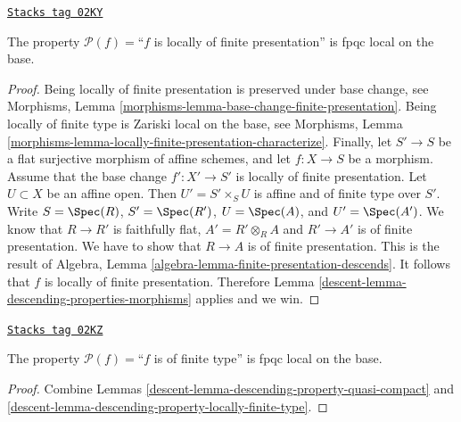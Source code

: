 \begin{lemma}
\label{descent-lemma-descending-property-locally-finite-presentation}
\href{https://stacks.math.columbia.edu/tag/02KY}{\texttt{Stacks tag 02KY}}

The property $\mathcal{P}(f) =$``$f$ is locally of finite presentation''
is fpqc local on the base.
\end{lemma}

\begin{proof}

Being locally of finite presentation is preserved under base change, see
Morphisms, Lemma \ref{morphisms-lemma-base-change-finite-presentation}.
Being locally of finite type is Zariski local on the base, see Morphisms,
Lemma \ref{morphisms-lemma-locally-finite-presentation-characterize}.
Finally, let
$S' \to S$ be a flat surjective morphism of affine schemes,
and let $f : X \to S$ be a morphism. Assume that the base change
$f' : X' \to S'$ is locally of finite presentation.
Let $U \subset X$ be an affine open. Then $U' = S' \times_S U$
is affine and of finite type over $S'$. Write
$S = \Spec(R)$,
$S' = \Spec(R')$,
$U = \Spec(A)$, and
$U' = \Spec(A')$.
We know that $R \to R'$ is faithfully flat,
$A' = R' \otimes_R A$ and $R' \to A'$ is of finite presentation.
We have to show that $R \to A$ is of finite presentation.
This is the result of
Algebra, Lemma \ref{algebra-lemma-finite-presentation-descends}.
It follows that $f$ is locally of finite presentation.
Therefore Lemma \ref{descent-lemma-descending-properties-morphisms} applies and we win.
\end{proof}

\begin{lemma}
\label{descent-lemma-descending-property-finite-type}
\href{https://stacks.math.columbia.edu/tag/02KZ}{\texttt{Stacks tag 02KZ}}

The property $\mathcal{P}(f) =$``$f$ is of finite type''
is fpqc local on the base.
\end{lemma}

\begin{proof}

Combine Lemmas \ref{descent-lemma-descending-property-quasi-compact}
and \ref{descent-lemma-descending-property-locally-finite-type}.
\end{proof}

